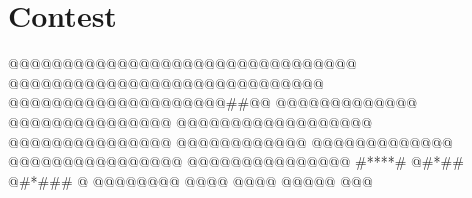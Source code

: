 \chapter{Contest}







\begingroup\makeatletter{}
\verbatim






@@@@@@@@@@@@@@@@@@@@@@@@@@@@@@@@%
@@@@@@@@@@@@@@@@@@@@@@@@@@@@@%
@@@@@@@@@@@@@@@@@@@@##@@%
@@@@@@@@@@@@@%
@@@@@@@@@@@@@@@%
@@@@@@@@@@@@@@@@@@%
@@@@@@@@@@@@@@@%
@@@@@@@@@@@@%
@@@@@@@@@@@@@%
@@@@@@@@@@@@@@@@%
@@@@@@@@@@@@@@@%
#****#%
@#*##%
@#*###%
@%
@@@@@@@@%
@@@@%
@@@@%
@@@@@%
@@@%
